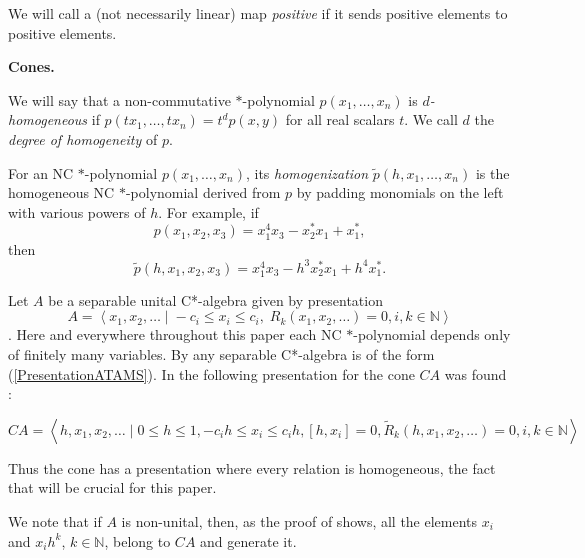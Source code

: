 \documentclass{article}%
\begin{document}
We will call a (not necessarily linear) map {\it positive} if  it sends positive elements to positive elements.



\bigskip



{\bf Cones.}

\medskip


We will say that a non-commutative $\ast$-polynomial $p(x_1, \ldots, x_n)$ is {\it $d$-homogeneous} if $p(tx_1, \ldots, tx_n) = t^d p(x, y)$
for all real scalars $t$.  We call $d$  the {\it degree of homogeneity} of $p$.

For an NC $\ast$-polynomial $p(x_1, \ldots, x_n)$,   its {\it homogenization} $\tilde p(h, x_1, \ldots, x_n)$ is the homogeneous NC $\ast$-polynomial derived from $p$ by padding monomials on the left with
various powers of $h$. For example, if $$p(x_1, x_2, x_3) = x_1^4x_3 - x_2^*x_1 + x_1^*,$$ then
$$\tilde p (h, x_1, x_2, x_3) = x_1^4x_3 - h^3x_2^*x_1 + h^4x_1^*.$$

Let $A$ be a separable unital C*-algebra given by presentation
\begin{equation}\label{PresentationATAMS}A = \left\langle x_1, x_2, \ldots\;|\; -c_i\le x_i\le c_i,\; R_k(x_1, x_2, \ldots) =0, i, k\in \mathbb N\right\rangle\end{equation}.  Here and everywhere throughout this paper each
NC $\ast$-polynomial depends only of finitely many variables. By \cite[Lemma 7.3]{LoringShulman} any separable C*-algebra is of the form (\ref{PresentationATAMS}).  In \cite[Lemma 7.1]{LoringShulman} the following presentation  for the cone $CA$  was found
:

\begin{equation}\label{ConePresentationTAMS}  CA = \left\langle  h, x_1, x_2, \ldots\;|\; 0\le h\le 1, -c_ih\le x_i\le c_ih, [h, x_i] = 0, \tilde R_k(h, x_1, x_2, \ldots) = 0, i, k \in \mathbb N \right\rangle \end{equation}

Thus the cone has a presentation where every relation is homogeneous, the fact that will be crucial for this paper.

We note that if $A$ is non-unital, then, as the proof of \cite[Lemma 7.1]{LoringShulman} shows, all the elements $x_i$ and $x_ih^k$, $k\in \mathbb N$,  belong to $CA$ and generate it.
\end{document}
